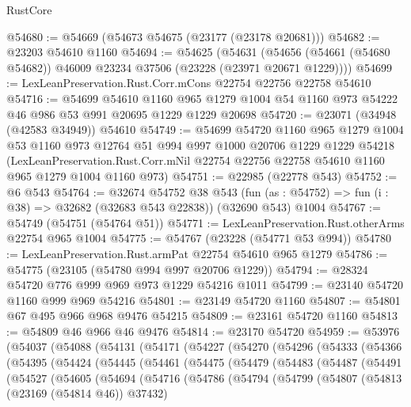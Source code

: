 \begin{lexlean}{RustCore}
\begin{coremodule}
@54680 := @54669 (@54673 @54675 (@23177 (@23178 @20681)))
@54682 := @23203 @54610 @1160
@54694 := @54625
    (@54631 (@54656 (@54661 (@54680 @54682)) @46009 @23234 @37506 (@23228 (@23971 @20671 @1229))))
@54699 := LexLeanPreservation.Rust.Corr.mCons @22754 @22756 @22758 @54610
@54716 := @54699
    @54610
    @1160
    @965
    @1279
    @1004
    @54
    @1160
    @973
    @54222
    @46
    @986
    @53
    @991
    @20695
    @1229
    @1229
    @20698
@54720 := @23071 (@34948 (@42583 @34949)) @54610
@54749 := @54699
    @54720
    @1160
    @965
    @1279
    @1004
    @53
    @1160
    @973
    @12764
    @51
    @994
    @997
    @1000
    @20706
    @1229
    @1229
    @54218
    (LexLeanPreservation.Rust.Corr.mNil
      @22754
      @22756
      @22758
      @54610
      @1160
      @965
      @1279
      @1004
      @1160
      @973)
@54751 := @22985 (@22778 @543)
@54752 := @6 @543
@54764 := @32674
    @54752
    @38
    @543
    (fun (as : @54752) => fun (i : @38) => @32682 (@32683 @543 @22838))
    (@32690 @543)
    @1004
@54767 := @54749 (@54751 (@54764 @51))
@54771 := LexLeanPreservation.Rust.otherArms @22754 @965 @1004
@54775 := @54767 (@23228 (@54771 @53 @994))
@54780 := LexLeanPreservation.Rust.armPat @22754 @54610 @965 @1279
@54786 := @54775 (@23105 (@54780 @994 @997 @20706 @1229))
@54794 := @28324 @54720 @776 @999 @969 @973 @1229 @54216 @1011
@54799 := @23140 @54720 @1160 @999 @969 @54216
@54801 := @23149 @54720 @1160
@54807 := @54801 @67 @495 @966 @968 @9476 @54215
@54809 := @23161 @54720 @1160
@54813 := @54809 @46 @966 @46 @9476
@54814 := @23170 @54720
@54959 := @53976
    (@54037
      (@54088
        (@54131
          (@54171
            (@54227
              (@54270
                (@54296
                  (@54333
                    (@54366
                      (@54395
                        (@54424
                          (@54445
                            (@54461
                              (@54475
                                (@54479
                                  (@54483
                                    (@54487
                                      (@54491
                                        (@54527
                                          (@54605
                                            (@54694
                                              (@54716
                                                (@54786
                                                  (@54794
                                                    (@54799
                                                      (@54807
                                                        (@54813 (@23169 (@54814 @46)) @37432)

\end{coremodule}
\end{lexlean}
